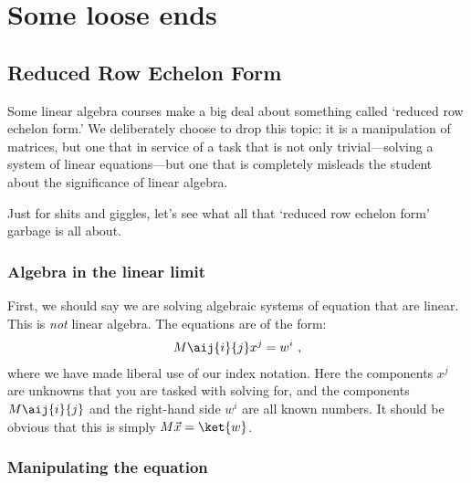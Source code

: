 \chapter{Some loose ends}


\section{Reduced Row Echelon Form}

Some linear algebra courses make a big deal about something called `reduced row echelon form.' We deliberately choose to drop this topic: it is a manipulation of matrices, but one that in service of a task that is not only trivial---solving a system of linear equations---but one that is completely misleads the student about the significance of linear algebra.

Just for shits and giggles, let's see what all that `reduced row echelon form' garbage is all about.

\subsection{Algebra in the linear limit}

First, we should say we are solving algebraic systems of equation that are linear. This is \emph{not} linear algebra. The equations are of the form:
\begin{align}
    M\aij{i}{j}x^j = w^i
    \ ,
    \label{eq:rref:eq}
\end{align}
where we have made liberal use of our index notation. Here the components $x^j$ are unknowns that you are tasked with solving for, and the components $M\aij{i}{j}$ and the right-hand side $w^i$ are all known numbers. It should be obvious that this is simply $M\vec{x} = \ket{w}$. 

\subsection{Manipulating the equation}

